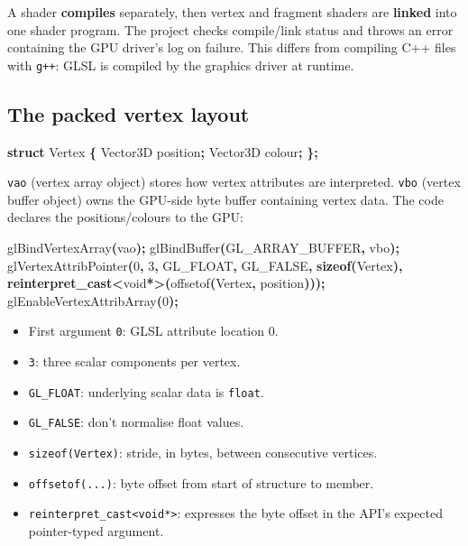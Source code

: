 \documentclass[
  10pt,
  a4paper,
]{article}
\newenvironment{Shaded}{\begin{snugshade}}{\end{snugshade}}
\newcommand{\DataTypeTok}[1]{\textcolor[rgb]{0.13,0.29,0.53}{#1}}
\newcommand{\DecValTok}[1]{\textcolor[rgb]{0.00,0.00,0.81}{#1}}
\newcommand{\KeywordTok}[1]{\textcolor[rgb]{0.13,0.29,0.53}{\textbf{#1}}}
\newcommand{\NormalTok}[1]{#1}
\newcommand{\OperatorTok}[1]{\textcolor[rgb]{0.81,0.36,0.00}{\textbf{#1}}}
\providecommand{\tightlist}{%
  \setlength{\itemsep}{0pt}\setlength{\parskip}{0pt}}
\begin{document}
A shader \textbf{compiles} separately, then vertex and fragment shaders
are \textbf{linked} into one shader program. The project checks
compile/link status and throws an error containing the GPU driver's log
on failure. This differs from compiling C++ files with \texttt{g++}:
GLSL is compiled by the graphics driver at runtime.

\subsection{The packed vertex layout}\label{the-packed-vertex-layout}

\begin{Shaded}
\begin{Highlighting}[]
\KeywordTok{struct}\NormalTok{ Vertex }\OperatorTok{\{}
\NormalTok{    Vector3D position}\OperatorTok{;}
\NormalTok{    Vector3D colour}\OperatorTok{;}
\OperatorTok{\};}
\end{Highlighting}
\end{Shaded}

\texttt{vao} (vertex array object) stores how vertex attributes are
interpreted. \texttt{vbo} (vertex buffer object) owns the GPU-side byte
buffer containing vertex data. The code declares the positions/colours
to the GPU:

\begin{Shaded}
\begin{Highlighting}[]
\NormalTok{glBindVertexArray}\OperatorTok{(}\NormalTok{vao}\OperatorTok{);}
\NormalTok{glBindBuffer}\OperatorTok{(}\NormalTok{GL\_ARRAY\_BUFFER}\OperatorTok{,}\NormalTok{ vbo}\OperatorTok{);}
\NormalTok{glVertexAttribPointer}\OperatorTok{(}\DecValTok{0}\OperatorTok{,} \DecValTok{3}\OperatorTok{,}\NormalTok{ GL\_FLOAT}\OperatorTok{,}\NormalTok{ GL\_FALSE}\OperatorTok{,}
    \KeywordTok{sizeof}\OperatorTok{(}\NormalTok{Vertex}\OperatorTok{),} \KeywordTok{reinterpret\_cast}\OperatorTok{\textless{}}\DataTypeTok{void}\OperatorTok{*\textgreater{}(}\NormalTok{offsetof}\OperatorTok{(}\NormalTok{Vertex}\OperatorTok{,}\NormalTok{ position}\OperatorTok{)));}
\NormalTok{glEnableVertexAttribArray}\OperatorTok{(}\DecValTok{0}\OperatorTok{);}
\end{Highlighting}
\end{Shaded}

\begin{itemize}
\tightlist
\item
  First argument \texttt{0}: GLSL attribute location 0.
\item
  \texttt{3}: three scalar components per vertex.
\item
  \texttt{GL\_FLOAT}: underlying scalar data is \texttt{float}.
\item
  \texttt{GL\_FALSE}: don't normalise float values.
\item
  \texttt{sizeof(Vertex)}: stride, in bytes, between consecutive
  vertices.
\item
  \texttt{offsetof(...)}: byte offset from start of structure to member.
\item
  \texttt{reinterpret\_cast\textless{}void*\textgreater{}}: expresses
  the byte offset in the API's expected pointer-typed argument.
\end{itemize}
\end{document}
